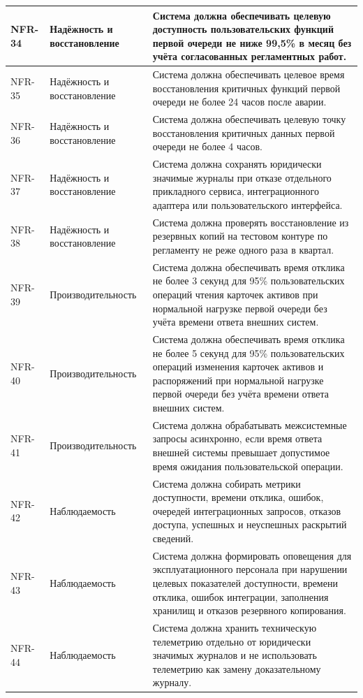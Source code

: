 \begin{longtable}{|P{1.45cm}|P{3.35cm}|P{10.7cm}|}
NFR-34 & Надёжность и восстановление & Система должна обеспечивать целевую доступность пользовательских функций первой очереди не ниже 99{,}5\% в месяц без учёта согласованных регламентных работ.\\ \hline
NFR-35 & Надёжность и восстановление & Система должна обеспечивать целевое время восстановления критичных функций первой очереди не более 24 часов после аварии.\\ \hline
NFR-36 & Надёжность и восстановление & Система должна обеспечивать целевую точку восстановления критичных данных первой очереди не более 4 часов.\\ \hline
NFR-37 & Надёжность и восстановление & Система должна сохранять юридически значимые журналы при отказе отдельного прикладного сервиса, интеграционного адаптера или пользовательского интерфейса.\\ \hline
NFR-38 & Надёжность и восстановление & Система должна проверять восстановление из резервных копий на тестовом контуре по регламенту не реже одного раза в квартал.\\ \hline
NFR-39 & Производительность & Система должна обеспечивать время отклика не более 3 секунд для 95\% пользовательских операций чтения карточек активов при нормальной нагрузке первой очереди без учёта времени ответа внешних систем.\\ \hline
NFR-40 & Производительность & Система должна обеспечивать время отклика не более 5 секунд для 95\% пользовательских операций изменения карточек активов и распоряжений при нормальной нагрузке первой очереди без учёта времени ответа внешних систем.\\ \hline
NFR-41 & Производительность & Система должна обрабатывать межсистемные запросы асинхронно, если время ответа внешней системы превышает допустимое время ожидания пользовательской операции.\\ \hline
NFR-42 & Наблюдаемость & Система должна собирать метрики доступности, времени отклика, ошибок, очередей интеграционных запросов, отказов доступа, успешных и неуспешных раскрытий сведений.\\ \hline
NFR-43 & Наблюдаемость & Система должна формировать оповещения для эксплуатационного персонала при нарушении целевых показателей доступности, времени отклика, ошибок интеграции, заполнения хранилищ и отказов резервного копирования.\\ \hline
NFR-44 & Наблюдаемость & Система должна хранить техническую телеметрию отдельно от юридически значимых журналов и не использовать телеметрию как замену доказательному журналу.\\ \hline

\end{longtable}
